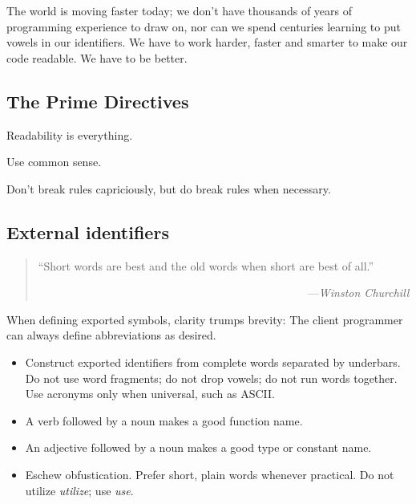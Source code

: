 The world is moving faster today; we don't have thousands of years of 
programming experience to draw on, nor can we spend centuries learning 
to put vowels in our identifiers.  We have to work harder, faster and 
smarter to make our code readable.  We have to be better. 


\subsection{The Prime Directives}

Readability is everything.

Use common sense.

Don't break rules capriciously, but do break rules when necessary.


\subsection{External identifiers}

\begin{quote}\begin{tiny}
                ``Short words are best and the old words when short are best of all.''\newline

               ~~~~~~~~~~~~~~~~~~~~~~~~~~~~~~~~~~~~~~~~~~~~~~~~---{\em Winston Churchill}
\end{tiny}\end{quote}

When defining exported symbols, clarity trumps brevity:  The client 
programmer can always define abbreviations as desired.

\begin{itemize}
\item Construct exported identifiers from complete words separated by underbars. 
  Do not use word fragments;  do not drop vowels;  do not run words together. 
Use acronyms only when universal, such as {\sc ASCII}. 
\item A verb followed by a noun makes a good function name.
\item An adjective followed by a noun makes a good type or constant name.
\item Eschew obfustication.  Prefer short, plain words whenever practical.  Do not utilize {\em utilize};  use {\em use}.
\end{itemize}

